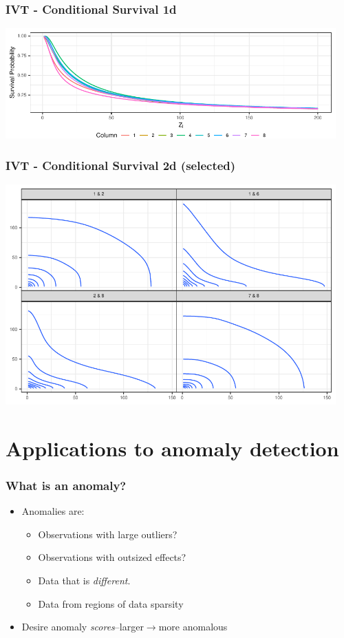 \documentclass[aspectratio=169]{beamer}
\begin{document}
\begin{frame}
  \frametitle{IVT - Conditional Survival 1d}
  \begin{center}
    \includegraphics[width = 5in]{./images/condsurv_1d}
  \end{center}
\end{frame}

\begin{frame}
  \frametitle{IVT - Conditional Survival 2d (selected)}
  \begin{center}
    \includegraphics[width = 5in]{./images/condsurv_2d}
  \end{center}
\end{frame}

\section{Applications to anomaly detection}

\begin{frame}
  \frametitle{What is an anomaly?}
  \begin{itemize}
    \item Anomalies are:
      \begin{itemize}
        \item Observations with large outliers?
        \item Observations with outsized effects?
        \item Data that is \emph{different}.
        \item Data from regions of data sparsity
      \end{itemize}
    \item Desire anomaly \emph{scores}--larger$\rightarrow$more anomalous
  \end{itemize}
\end{frame}
\end{document}
